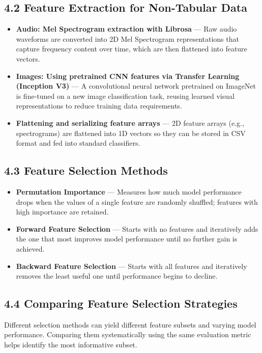 \documentclass[12pt, a4paper]{article}
\begin{document}
\subsection*{4.2 Feature Extraction for Non-Tabular Data}
\begin{itemize}
    \item \textbf{Audio: Mel Spectrogram extraction with Librosa} --- Raw audio waveforms are converted into 2D Mel Spectrogram representations that capture frequency content over time, which are then flattened into feature vectors.
    \item \textbf{Images: Using pretrained CNN features via Transfer Learning (Inception V3)} --- A convolutional neural network pretrained on ImageNet is fine-tuned on a new image classification task, reusing learned visual representations to reduce training data requirements.
    \item \textbf{Flattening and serializing feature arrays} --- 2D feature arrays (e.g., spectrograms) are flattened into 1D vectors so they can be stored in CSV format and fed into standard classifiers.
\end{itemize}

\subsection*{4.3 Feature Selection Methods}
\begin{itemize}
    \item \textbf{Permutation Importance} --- Measures how much model performance drops when the values of a single feature are randomly shuffled; features with high importance are retained.
    \item \textbf{Forward Feature Selection} --- Starts with no features and iteratively adds the one that most improves model performance until no further gain is achieved.
    \item \textbf{Backward Feature Selection} --- Starts with all features and iteratively removes the least useful one until performance begins to decline.
\end{itemize}

\subsection*{4.4 Comparing Feature Selection Strategies}
Different selection methods can yield different feature subsets and varying model performance. Comparing them systematically using the same evaluation metric helps identify the most informative subset.
\end{document}
